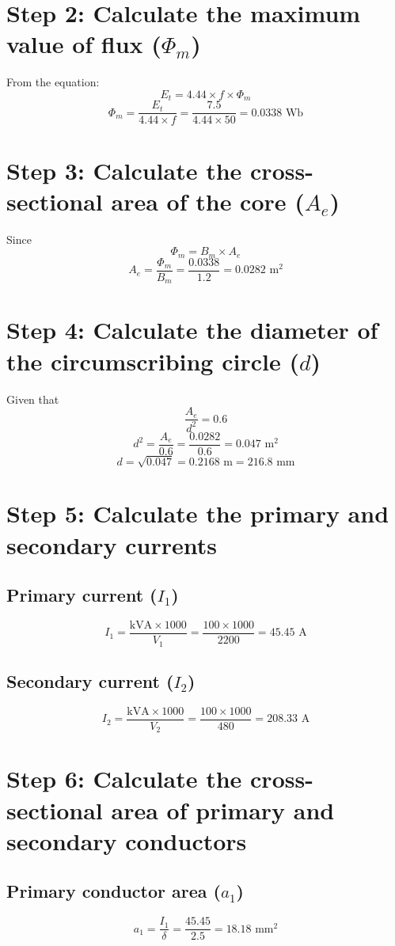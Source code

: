 \documentclass[12pt]{article}
\begin{document}
\section*{Step 2: Calculate the maximum value of flux ($\Phi_m$)}
From the equation: 
\[
E_t = 4.44 \times f \times \Phi_m
\]
\[
\Phi_m = \frac{E_t}{4.44 \times f} = \frac{7.5}{4.44 \times 50} = 0.0338 \text{ Wb}
\]

\section*{Step 3: Calculate the cross-sectional area of the core ($A_e$)}
Since 
\[
\Phi_m = B_m \times A_e
\]
\[
A_e = \frac{\Phi_m}{B_m} = \frac{0.0338}{1.2} = 0.0282 \text{ m}^2
\]

\section*{Step 4: Calculate the diameter of the circumscribing circle ($d$)}
Given that 
\[
\frac{A_e}{d^2} = 0.6
\]
\[
d^2 = \frac{A_e}{0.6} = \frac{0.0282}{0.6} = 0.047 \text{ m}^2
\]
\[
d = \sqrt{0.047} = 0.2168 \text{ m} = 216.8 \text{ mm}
\]

\section*{Step 5: Calculate the primary and secondary currents}
\subsection*{Primary current ($I_1$)}
\[
I_1 = \frac{\text{kVA} \times 1000}{V_1} = \frac{100 \times 1000}{2200} = 45.45 \text{ A}
\]

\subsection*{Secondary current ($I_2$)}
\[
I_2 = \frac{\text{kVA} \times 1000}{V_2} = \frac{100 \times 1000}{480} = 208.33 \text{ A}
\]

\section*{Step 6: Calculate the cross-sectional area of primary and secondary conductors}
\subsection*{Primary conductor area ($a_1$)}
\[
a_1 = \frac{I_1}{\delta} = \frac{45.45}{2.5} = 18.18 \text{ mm}^2
\]
\end{document}
